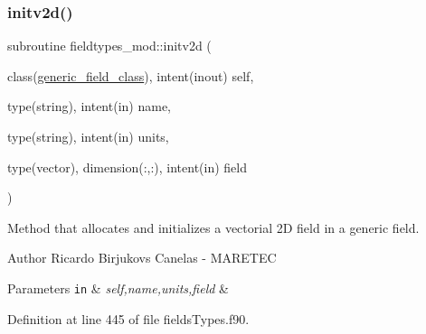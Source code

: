 \subsubsection{\texorpdfstring{initv2d()}{initv2d()}}
{\footnotesize\ttfamily subroutine fieldtypes\+\_\+mod\+::initv2d (\begin{DoxyParamCaption}\item[{class(\mbox{\hyperlink{structfieldtypes__mod_1_1generic__field__class}{generic\+\_\+field\+\_\+class}}), intent(inout)}]{self,  }\item[{type(string), intent(in)}]{name,  }\item[{type(string), intent(in)}]{units,  }\item[{type(vector), dimension(\+:,\+:), intent(in)}]{field }\end{DoxyParamCaption})\hspace{0.3cm}{\ttfamily [private]}}



Method that allocates and initializes a vectorial 2D field in a generic field. 

\begin{DoxyAuthor}{Author}
Ricardo Birjukovs Canelas -\/ M\+A\+R\+E\+T\+EC 
\end{DoxyAuthor}

\begin{DoxyParams}[1]{Parameters}
\mbox{\tt in}  & {\em self,name,units,field} & \\
\hline
\end{DoxyParams}


Definition at line 445 of file fields\+Types.\+f90.


